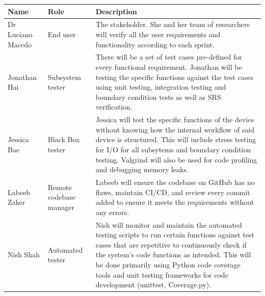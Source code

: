 \documentclass[12pt, titlepage]{article}
\begin{document}
\begin{center}
  \begin{tabular}{|m{5em}|m{5em}|m{25em}|}

    \hline
    \label{4_1}\textbf{Name} & \textbf{Role}                 & \textbf{Description}                                                                                                                                                                                                                                                \\
    \hline
    Dr Luciano Macedo        & End user                      & The stakeholder. She and her team of researchers will verify all the user requirements and functionality according to each sprint.                                                                                                                                                       \\
    \hline
    Jonathan Hai            & Subsystem tester              & There will be a set of test cases pre-defined for every functional requirement. Jonathan will be testing the specific functions against the test cases using unit testing, integration testing and boundary condition tests as well as SRS verification.            \\
    \hline
    Jessica Bae              & Black Box tester              & Jessica will test the specific functions of the device without knowing how the internal workflow of said device is structured. This will include stress testing for I/O for all subsytems and boundary condition testing. Valgrind will also be used for code profiling and debugging memory leaks.        \\
    \hline
    Labeeb Zaker             & Remote codebase manager       & Labeeb will ensure the codebase on GitHub has no flaws, maintain CI/CD, and review every commit added to ensure it meets the requirements without any errors.                                                                                              \\
    \hline
    Nish Shah                & Automated tester              & Nish will monitor and maintain the automated testing scripts to run certain functions against test cases that are repetitive to continuously check if the system's code functions as intended. This will be done primarily using Python code coverage tools and unit testing frameworks for code development (unittest, Coverage.py). \\

\end{tabular}
\end{center}
\end{document}
